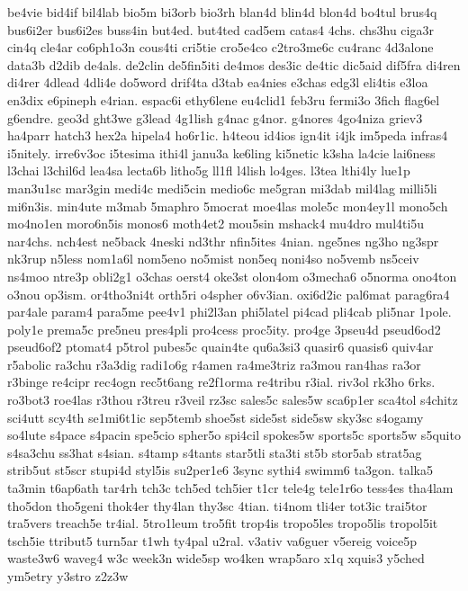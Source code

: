{be4vie
bid4if
bil4lab
bio5m
bi3orb
bio3rh
blan4d
blin4d
blon4d
bo4tul
brus4q
bus6i2er
bus6i2es
buss4in
but4ed.
but4ted
cad5em
catas4
4chs.
chs3hu
ciga3r
cin4q
cle4ar
co6ph1o3n
cous4ti
cri5tie
cro5e4co
c2tro3me6c
cu4ranc
4d3alone
data3b
d2dib
de4als.
de2clin
de5fin5iti
de4mos
des3ic
de4tic
dic5aid
dif5fra
di4ren
di4rer
4dlead
4dli4e
do5word
drif4ta
d3tab
ea4nies
e3chas
edg3l
eli4tis
e3loa
en3dix
e6pineph
e4rian.
espac6i
ethy6lene
eu4clid1
feb3ru
fermi3o
3fich
flag6el
g6endre.
geo3d
ght3we
g3lead
4g1lish
g4nac
g4nor.
g4nores
4go4niza
griev3
ha4parr
hatch3
hex2a
hipela4
ho6r1ic.
h4teou
id4ios
ign4it
i4jk
im5peda
infras4
i5nitely.
irre6v3oc
i5tesima
ithi4l
janu3a
ke6ling
ki5netic
k3sha
la4cie
lai6ness
l3chai
l3chil6d
lea4sa
lecta6b
litho5g
ll1fl
l4lish
lo4ges.
l3tea
lthi4ly
lue1p
man3u1sc
mar3gin
medi4c
medi5cin
medio6c
me5gran
mi3dab
mil4lag
milli5li
mi6n3is.
min4ute
m3mab
5maphro
5mocrat
moe4las
mole5c
mon4ey1l
mono5ch
mo4no1en
moro6n5is
monos6
moth4et2
mou5sin
mshack4
mu4dro
mul4ti5u
nar4chs.
nch4est
ne5back
4neski
nd3thr
nfin5ites
4nian.
nge5nes
ng3ho
ng3spr
nk3rup
n5less
nom1a6l
nom5eno
no5mist
non5eq
noni4so
no5vemb
ns5ceiv
ns4moo
ntre3p
obli2g1
o3chas
oerst4
oke3st
olon4om
o3mecha6
o5norma
ono4ton
o3nou
op3ism.
or4tho3ni4t
orth5ri
o4spher
o6v3ian.
oxi6d2ic
pal6mat
parag6ra4
par4ale
param4
para5me
pee4v1
phi2l3an
phi5latel
pi4cad
pli4cab
pli5nar
1pole.
poly1e
prema5c
pre5neu
pres4pli
pro4cess
proc5ity.
pro4ge
3pseu4d
pseud6od2
pseud6of2
ptomat4
p5trol
pubes5c
quain4te
qu6a3si3
quasir6
quasis6
quiv4ar
r5abolic
ra3chu
r3a3dig
radi1o6g
r4amen
ra4me3triz
ra3mou
ran4has
ra3or
r3binge
re4cipr
rec4ogn
rec5t6ang
re2f1orma
re4tribu
r3ial.
riv3ol
rk3ho
6rks.
ro3bot3
roe4las
r3thou
r3treu
r3veil
rz3sc
sales5c
sales5w
sca6p1er
sca4tol
s4chitz
sci4utt
scy4th
se1mi6t1ic
sep5temb
shoe5st
side5st
side5sw
sky3sc
s4ogamy
so4lute
s4pace
s4pacin
spe5cio
spher5o
spi4cil
spokes5w
sports5c
sports5w
s5quito
s4sa3chu
ss3hat
s4sian.
s4tamp
s4tants
star5tli
sta3ti
st5b
stor5ab
strat5ag
strib5ut
st5scr
stupi4d
styl5is
su2per1e6
3sync
sythi4
swimm6
ta3gon.
talka5
ta3min
t6ap6ath
tar4rh
tch3c
tch5ed
tch5ier
t1cr
tele4g
tele1r6o
tess4es
tha4lam
tho5don
tho5geni
thok4er
thy4lan
thy3sc
4tian.
ti4nom
tli4er
tot3ic
trai5tor
tra5vers
treach5e
tr4ial.
5tro1leum
tro5fit
trop4is
tropo5les
tropo5lis
tropol5it
tsch5ie
ttribut5
turn5ar
t1wh
ty4pal
u2ral.
v3ativ
va6guer
v5ereig
voice5p
waste3w6
waveg4
w3c
week3n
wide5sp
wo4ken
wrap5aro
x1q
xquis3
y5ched
ym5etry
y3stro
z2z3w
}
